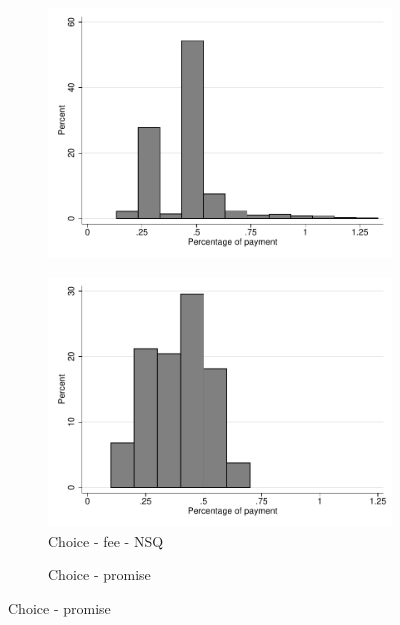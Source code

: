 \documentclass[11pt]{article}
\begin{document}
\begin{figure}[H]
\begin{center}
\begin{subfigure}{.31\textwidth}
        \includegraphics[width=\textwidth]{Figuras/hist_porc_pay_cond_pro_6.pdf}
    \end{subfigure}    
     \begin{subfigure}{.31\textwidth}
    \caption{Choice - fee - NSQ}
        \centering
        \includegraphics[width=\textwidth]{Figuras/hist_porc_pay_cond_pro_7.pdf}
    \end{subfigure}    
     \begin{subfigure}{.31\textwidth}
    \caption{Choice - promise}
        \centering

\end{subfigure}
\end{center}
\end{figure}
\end{document}
